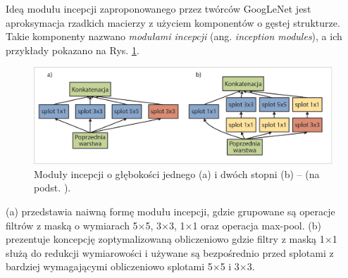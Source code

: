 Ideą modułu incepcji zaproponowanego przez twórców GoogLeNet jest aproksymacja rzadkich macierzy z użyciem komponentów o gęstej strukturze. Takie komponenty nazwano \textit{modułami incepcji} (ang. \textit{inception modules}), a ich przykłady pokazano na Rys. \ref{GoogleNetInceptionModules}. 
\begin{figure}[h!]
	\centering
	\includegraphics[width=1\textwidth]{figures/InceptionModules.jpg}
	\caption{Moduły incepcji o głębokości jednego (a) i dwóch stopni (b) -- (na podst. \cite{GoogleNet}).}
	\label{GoogleNetInceptionModules}
\end{figure}

(a) przedstawia naiwną formę modułu incepcji, gdzie grupowane są operacje filtrów z maską o wymiarach 5$\times$5, 3$\times$3, 1$\times$1 oraz operacja max-pool. (b) prezentuje koncepcję zoptymalizowaną obliczeniowo gdzie filtry z maską 1$\times$1 służą do redukcji wymiarowości i używane są bezpośrednio przed splotami z bardziej wymagającymi obliczeniowo splotami 5$\times$5 i 3$\times$3. 

